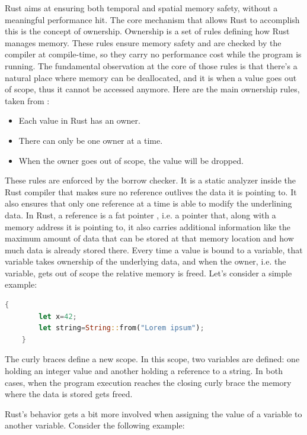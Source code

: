 \documentclass{report}
\begin{document}
Rust aims at ensuring both temporal and spatial memory safety, without a meaningful performance hit. The core mechanism that allows Rust to accomplish this is the concept of
ownership. Ownership is a set of rules defining how Rust manages memory. These rules ensure memory safety and are checked by the compiler at compile-time, so they carry no
performance cost while the program is running. The fundamental observation at the core of those rules is that there's a natural place where memory can be deallocated, and it is when
a value goes out of scope, thus it cannot be accessed anymore. Here are the main ownership rules, taken from \cite{rust_ownership_rules}:

		\begin{itemize}
				\item Each value in Rust has an owner.
				\item There can only be one owner at a time.
				\item When the owner goes out of scope, the value will be dropped.
		\end{itemize}

These rules are enforced by the borrow checker. It is a static analyzer inside the Rust compiler that makes sure no reference outlives the data it is pointing to. It also ensures
that only one reference at a time is able to modify the underlining data. In Rust, a reference is a fat pointer , i.e. a pointer that, along with a memory address it
is pointing to, it also carries additional information like the maximum amount of data that can be stored at that memory location and how much data is already stored there. 
Every time a value is bound to a variable, that variable takes ownership of the underlying data, and when the owner, i.e. the variable, gets out of scope the relative memory is
freed. Let's consider a simple example:

\begin{lstlisting}[language=Rust, style=colouredRust]
	{
		let x=42;
		let string=String::from("Lorem ipsum");
	}
\end{lstlisting}

The curly braces define a new scope. In this scope, two variables are defined: one holding an integer value and another holding a reference to a string. In both cases, when the
program execution reaches the closing curly brace the memory where the data is stored gets freed. \par
Rust's behavior gets a bit more involved when assigning the value of a variable to another variable. Consider the following example:
\end{document}
